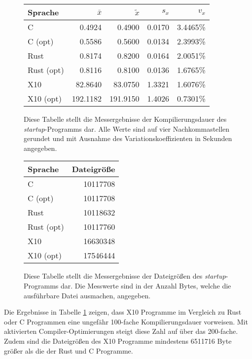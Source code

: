 \begin{figure}[hb]
	\begin{center}
		\begin{tabular}{lrrrr}
			\toprule
			Sprache    & $\bar{x}$ & $\tilde{x}$ & $s_x$ & $v_x$\\
			\midrule
			C          &   0.4924 &   0.4900 & 0.0170 & 3.4465\% \\
			C (opt)    &   0.5586 &   0.5600 & 0.0134 & 2.3993\% \\
			Rust       &   0.8174 &   0.8200 & 0.0164 & 2.0051\% \\
			Rust (opt) &   0.8116 &   0.8100 & 0.0136 & 1.6765\% \\
			X10        &  82.8640 &  83.0750 & 1.3321 & 1.6076\% \\
			X10 (opt)  & 192.1182 & 191.9150 & 1.4026 & 0.7301\% \\
			\bottomrule
		\end{tabular}
	\end{center}
	\caption{
		Diese Tabelle stellt die Messergebnisse der Kompilierungsdauer des \textit{startup}-Programms dar.
		Alle Werte sind auf vier Nachkommastellen gerundet und mit Ausnahme des Variationskoeffizienten
		in Sekunden angegeben.
	}
	\label{fig:compile_table}
\end{figure}

\begin{figure}[hb]
	\begin{center}
		\begin{tabular}{lr}
			\toprule
			Sprache & Dateigröße \\
			\midrule
			C          & 10117708 \\
			C (opt)    & 10117708 \\
			Rust       & 10118632 \\
			Rust (opt) & 10117760 \\
			X10        & 16630348 \\
			X10 (opt)  & 17546444 \\
			\bottomrule
		\end{tabular}
	\end{center}
	\caption{
		Diese Tabelle stellt die Messergebnisse der Dateigrößen des \textit{startup}-Programms dar.
		Die Messwerte sind in der Anzahl Bytes, welche die ausführbare Datei ausmachen, angegeben.
	}
	\label{fig:filesize_table}
\end{figure}

Die Ergebnisse in Tabelle \ref{fig:compile_table} zeigen, dass X10 Programme im Vergleich zu Rust oder C Programmen
eine ungefähr 100-fache Kompilierungsdauer vorweisen. Mit aktivierten Compiler-Optimierungen steigt diese
Zahl auf über das 200-fache. Zudem sind die Dateigrößen des X10 Programme mindestens 6511716 Byte
größer als die der Rust und C Programme.

